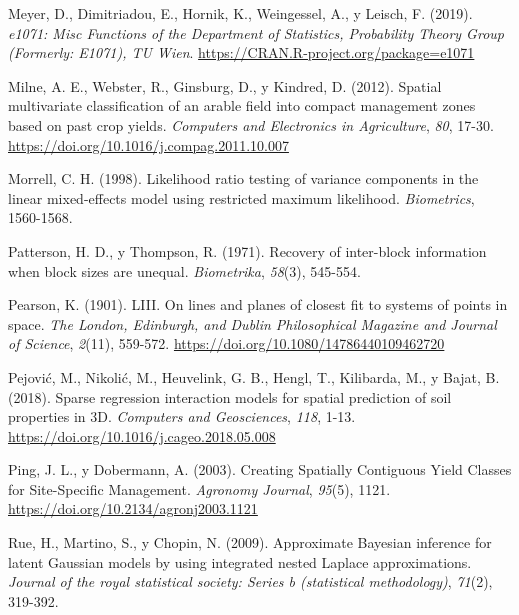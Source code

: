 \documentclass[11pt,b5paper,]{krantz}
\begin{document}
\leavevmode\hypertarget{ref-R-e1071}{}%
Meyer, D., Dimitriadou, E., Hornik, K., Weingessel, A., y Leisch, F. (2019). \emph{e1071: Misc Functions of the Department of Statistics, Probability Theory Group (Formerly: E1071), TU Wien}. \url{https://CRAN.R-project.org/package=e1071}

\leavevmode\hypertarget{ref-Milne_Webster_Ginsburg_Kindred_2012}{}%
Milne, A. E., Webster, R., Ginsburg, D., y Kindred, D. (2012). Spatial multivariate classification of an arable field into compact management zones based on past crop yields. \emph{Computers and Electronics in Agriculture}, \emph{80}, 17-30. \url{https://doi.org/10.1016/j.compag.2011.10.007}

\leavevmode\hypertarget{ref-Morrell_1998}{}%
Morrell, C. H. (1998). Likelihood ratio testing of variance components in the linear mixed-effects model using restricted maximum likelihood. \emph{Biometrics}, 1560-1568.

\leavevmode\hypertarget{ref-Patterson_Thompson_1971}{}%
Patterson, H. D., y Thompson, R. (1971). Recovery of inter-block information when block sizes are unequal. \emph{Biometrika}, \emph{58}(3), 545-554.

\leavevmode\hypertarget{ref-F.R.S._1901}{}%
Pearson, K. (1901). LIII. On lines and planes of closest fit to systems of points in space. \emph{The London, Edinburgh, and Dublin Philosophical Magazine and Journal of Science}, \emph{2}(11), 559-572. \url{https://doi.org/10.1080/14786440109462720}

\leavevmode\hypertarget{ref-Pejoviux107_Nikoliux107_Heuvelink_Hengl_Kilibarda_Bajat_2018}{}%
Pejović, M., Nikolić, M., Heuvelink, G. B., Hengl, T., Kilibarda, M., y Bajat, B. (2018). Sparse regression interaction models for spatial prediction of soil properties in 3D. \emph{Computers and Geosciences}, \emph{118}, 1-13. \url{https://doi.org/10.1016/j.cageo.2018.05.008}

\leavevmode\hypertarget{ref-Ping_Dobermann_2003}{}%
Ping, J. L., y Dobermann, A. (2003). Creating Spatially Contiguous Yield Classes for Site-Specific Management. \emph{Agronomy Journal}, \emph{95}(5), 1121. \url{https://doi.org/10.2134/agronj2003.1121}

\leavevmode\hypertarget{ref-Rue_Martino_Chopin_2009}{}%
Rue, H., Martino, S., y Chopin, N. (2009). Approximate Bayesian inference for latent Gaussian models by using integrated nested Laplace approximations. \emph{Journal of the royal statistical society: Series b (statistical methodology)}, \emph{71}(2), 319-392.
\end{document}
